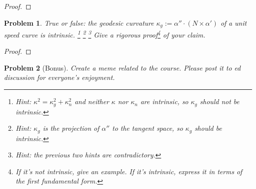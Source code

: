 \documentclass[11pt]{article}
\newtheorem{problem}{Problem}
\begin{document}
\begin{proof}

\end{proof}

\pagebreak


\begin{problem}
True or false: the geodesic curvature $\kappa_g:=\alpha''\cdot (N\times\alpha')$ of a unit speed curve is intrinsic. \footnote{Hint: $\kappa^2=\kappa_g^2+\kappa_n^2$ and neither $\kappa$ nor $\kappa_n$ are intrinsic, so $\kappa_g$ should not be intrinsic.} \footnote{Hint: $\kappa_g$ is the projection of $\alpha''$ to the tangent space, so $\kappa_g$ should be intrinsic.} \footnote{Hint: the previous two hints are contradictory.} Give a rigorous proof\footnote{If it's not intrinsic, give an example. If it's intrinsic, express it in terms of the first fundamental form.} of your claim.
\end{problem}

\begin{proof}

\end{proof}

\pagebreak

\begin{problem}[Bonus]
Create a meme related to the course. Please post it to ed discussion for everyone's enjoyment. 
\end{problem}
\end{document}
